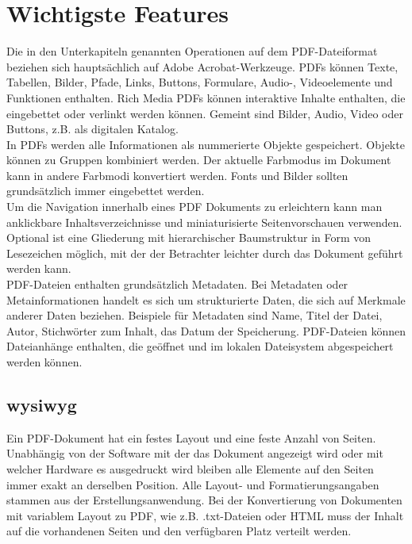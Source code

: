 \section{Wichtigste Features}
Die in den Unterkapiteln genannten Operationen auf dem PDF-Dateiformat beziehen sich hauptsächlich auf Adobe Acrobat-Werkzeuge. PDFs können Texte, Tabellen, Bilder, Pfade, Links, Buttons, Formulare, Audio-, Videoelemente und Funktionen enthalten. Rich Media PDFs können interaktive Inhalte enthalten, die eingebettet oder verlinkt werden können. Gemeint sind Bilder, Audio, Video oder Buttons, z.B. als digitalen Katalog. \cite{wiki-pdf-engl} \\ 
In PDFs werden alle Informationen als nummerierte Objekte gespeichert. Objekte können zu Gruppen kombiniert werden. Der aktuelle Farbmodus im Dokument kann in andere Farbmodi konvertiert werden. Fonts und Bilder sollten grundsätzlich immer eingebettet werden. \\
Um die Navigation innerhalb eines PDF Dokuments zu erleichtern kann man anklickbare Inhaltsverzeichnisse und miniaturisierte Seitenvorschauen verwenden. Optional ist eine Gliederung mit hierarchischer Baumstruktur in Form von Lesezeichen möglich, mit der der Betrachter leichter durch das Dokument geführt werden kann. \\
PDF-Dateien enthalten grundsätzlich Metadaten. Bei Metadaten oder Metainformationen handelt es sich um strukturierte Daten, die sich auf Merkmale anderer Daten beziehen. Beispiele für Metadaten sind Name, Titel der Datei, Autor, Stichwörter zum Inhalt, das Datum der Speicherung. PDF-Dateien können Dateianhänge enthalten, die geöffnet und im lokalen Dateisystem abgespeichert werden können. \cite{wiki-pdf-engl}

\subsection{\gls{wysiwyg}}
Ein PDF-Dokument hat ein festes Layout und eine feste Anzahl von Seiten. Unabhängig von der Software mit der das Dokument angezeigt wird oder mit welcher Hardware es ausgedruckt wird bleiben alle Elemente auf den Seiten immer exakt an derselben Position. Alle Layout- und Formatierungsangaben stammen aus der Erstellungsanwendung. Bei der Konvertierung von Dokumenten mit variablem Layout zu PDF, wie z.B. .txt-Dateien oder HTML muss der Inhalt auf die vorhandenen Seiten und den verfügbaren Platz verteilt werden. 

